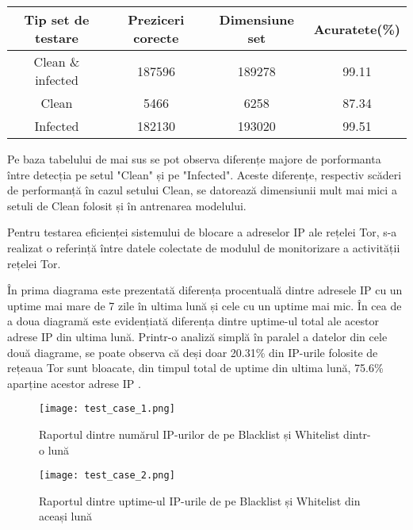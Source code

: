 \begin{center}
	\begin{tabular}{||c c c c||} 
		\hline
		Tip set de testare  & Preziceri corecte & Dimensiune set & Acuratete(\%) \\ [0.5ex] 
		\hline\hline
		Clean \& infected & 187596 & 189278 & 99.11 \\ 
		\hline
		Clean & 5466 & 6258 & 87.34 \\
		\hline
		Infected & 182130 & 193020 & 99.51 \\
		\hline
	\end{tabular}
\end{center}

Pe baza tabelului de mai sus se pot observa diferențe majore de porformanta între detecția pe setul "Clean" și pe "Infected". Aceste diferențe, respectiv scăderi de performanță în cazul setului Clean, se datorează dimensiunii mult mai mici a setuli de Clean folosit și în antrenarea modelului. 

Pentru testarea eficienței sistemului de blocare a adreselor IP ale rețelei Tor, s-a realizat o referință între datele colectate de modulul de monitorizare a activității rețelei Tor. 

În prima diagrama este prezentată diferența procentuală dintre adresele IP cu un uptime mai mare de 7 zile în ultima lună și cele cu un uptime mai mic. În cea de a doua diagramă este evidențiată diferența dintre uptime-ul total ale acestor adrese IP din ultima lună. Printr-o analiză simplă în paralel a datelor din cele două diagrame, se poate observa că deși doar 20.31\% din IP-urile folosite de rețeaua Tor sunt bloacate, din timpul total de uptime din ultima lună, 75.6\% aparține acestor adrese IP .

\begin{figure}
	\centering
	\texttt{[image: test\_case\_1.png]}
	\caption{ Raportul dintre numărul IP-urilor de pe Blacklist și Whitelist dintr-o lună }
	\label{fig:test_1}
\end{figure}

\begin{figure}
	\centering
	\texttt{[image: test\_case\_2.png]}
	\caption{ Raportul dintre uptime-ul IP-urile de pe Blacklist și Whitelist din aceași lună }
	\label{fig:test_2}
\end{figure}


\newpage

